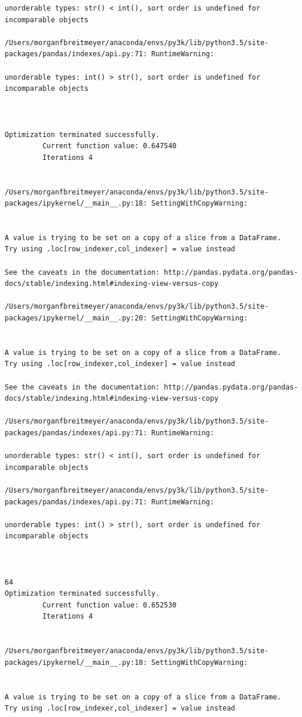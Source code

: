 \begin{lstlisting}
unorderable types: str() < int(), sort order is undefined for incomparable objects

/Users/morganfbreitmeyer/anaconda/envs/py3k/lib/python3.5/site-packages/pandas/indexes/api.py:71: RuntimeWarning:

unorderable types: int() > str(), sort order is undefined for incomparable objects



Optimization terminated successfully.
         Current function value: 0.647540
         Iterations 4


/Users/morganfbreitmeyer/anaconda/envs/py3k/lib/python3.5/site-packages/ipykernel/__main__.py:18: SettingWithCopyWarning:


A value is trying to be set on a copy of a slice from a DataFrame.
Try using .loc[row_indexer,col_indexer] = value instead

See the caveats in the documentation: http://pandas.pydata.org/pandas-docs/stable/indexing.html#indexing-view-versus-copy

/Users/morganfbreitmeyer/anaconda/envs/py3k/lib/python3.5/site-packages/ipykernel/__main__.py:20: SettingWithCopyWarning:


A value is trying to be set on a copy of a slice from a DataFrame.
Try using .loc[row_indexer,col_indexer] = value instead

See the caveats in the documentation: http://pandas.pydata.org/pandas-docs/stable/indexing.html#indexing-view-versus-copy

/Users/morganfbreitmeyer/anaconda/envs/py3k/lib/python3.5/site-packages/pandas/indexes/api.py:71: RuntimeWarning:

unorderable types: str() < int(), sort order is undefined for incomparable objects

/Users/morganfbreitmeyer/anaconda/envs/py3k/lib/python3.5/site-packages/pandas/indexes/api.py:71: RuntimeWarning:

unorderable types: int() > str(), sort order is undefined for incomparable objects



64
Optimization terminated successfully.
         Current function value: 0.652530
         Iterations 4


/Users/morganfbreitmeyer/anaconda/envs/py3k/lib/python3.5/site-packages/ipykernel/__main__.py:18: SettingWithCopyWarning:


A value is trying to be set on a copy of a slice from a DataFrame.
Try using .loc[row_indexer,col_indexer] = value instead


\end{lstlisting}
